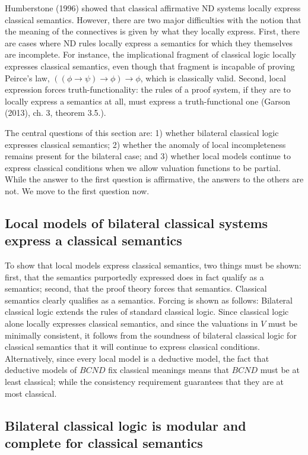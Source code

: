 \documentclass[]{article}
\begin{document}
Humberstone (1996) showed that classical affirmative ND systems locally express classical semantics. However, there are two major difficulties with the notion that the meaning of the connectives is given by what they locally express. First, there are cases where ND rules locally express a semantics for which they themselves are incomplete. For instance, the implicational fragment of classical logic locally expresses classical semantics, even though that fragment is incapable of proving Peirce's law, $((\phi\rightarrow\psi) \rightarrow \phi) \rightarrow \phi$, which is classically valid. Second, local expression forces truth-functionality: the rules of a proof system, if they are to locally express a semantics at all, must express a truth-functional one (Garson (2013), ch. 3, theorem 3.5.).

The central questions of this section are: 1) whether bilateral classical logic expresses classical semantics; 2) whether the anomaly of local incompleteness remains present for the bilateral case; and 3) whether local models continue to express classical conditions when we allow valuation functions to be partial. While the answer to the first question is affirmative, the answers to the others are not. We move to the first question now.

\subsection{Local models of bilateral classical systems express a classical semantics}
To show that local models express classical semantics, two things must be shown: first, that the semantics purportedly expressed does in fact qualify as a semantics; second, that the proof theory forces that semantics. Classical semantics clearly qualifies as a semantics. Forcing is shown as follows: Bilateral classical logic extends the rules of standard classical logic. Since classical logic alone locally expresses classical semantics, and since the valuations in $V$ must be minimally consistent, it follows from the soundness of bilateral classical logic for classical semantics that it will continue to express classical conditions. Alternatively, since every local model is a deductive model, the fact that deductive models of $BCND$ fix classical meanings means that $BCND$ must be at least classical; while the consistency requirement guarantees that they are at most classical.
\subsection{Bilateral classical logic is modular and complete for classical semantics}
\end{document}
